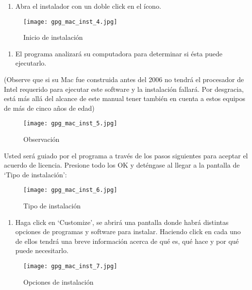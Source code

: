 \documentclass[10pt,a5paper,twoside,,]{book}
\providecommand{\tightlist}{%
  \setlength{\itemsep}{0pt}\setlength{\parskip}{0pt}}
\begin{document}
\begin{enumerate}
\def\labelenumi{\arabic{enumi}.}
\setcounter{enumi}{3}
\tightlist
\item
  Abra el instalador con un doble click en el ícono.
\end{enumerate}

\begin{figure}[htbp]
\centering
\texttt{[image: gpg\_mac\_inst\_4.jpg]}
\caption{Inicio de instalación}
\end{figure}

\begin{enumerate}
\def\labelenumi{\arabic{enumi}.}
\setcounter{enumi}{4}
\tightlist
\item
  El programa analizará su computadora para determinar si ésta puede
  ejecutarlo.
\end{enumerate}

(Observe que si su Mac fue construida antes del 2006 no tendrá el
procesador de Intel requerido para ejecutar este software y la
instalación fallará. Por desgracia, está más allá del alcance de este
manual tener también en cuenta a estos equipos de más de cinco años de
edad)

\begin{figure}[htbp]
\centering
\texttt{[image: gpg\_mac\_inst\_5.jpg]}
\caption{Observación}
\end{figure}

Usted será guiado por el programa a través de los pasos siguientes para
aceptar el acuerdo de licencia. Presione todo los OK y deténgase al
llegar a la pantalla de `Tipo de instalación':

\begin{figure}[htbp]
\centering
\texttt{[image: gpg\_mac\_inst\_6.jpg]}
\caption{Tipo de instalación}
\end{figure}

\begin{enumerate}
\def\labelenumi{\arabic{enumi}.}
\setcounter{enumi}{5}
\tightlist
\item
  Haga click en `Customize', se abrirá una pantalla donde habrá
  distintas opciones de programas y software para instalar. Haciendo
  click en cada uno de ellos tendrá una breve información acerca de qué
  es, qué hace y por qué puede necesitarlo.
\end{enumerate}

\begin{figure}[htbp]
\centering
\texttt{[image: gpg\_mac\_inst\_7.jpg]}
\caption{Opciones de instalación}
\end{figure}
\end{document}
